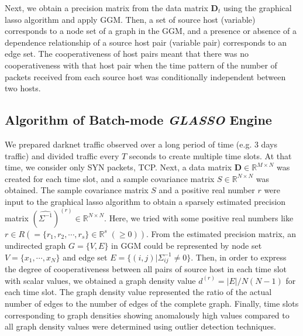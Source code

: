 \documentclass[conference]{IEEEtran}
\begin{document}
Next, we obtain a precision matrix from the data matrix $\bm{D}_t$ using the graphical lasso algorithm and apply GGM.
Then, a set of source host (variable) corresponds to a node set of a graph in the GGM, and a presence or absence of a dependence relationship of a source host pair (variable pair) corresponds to an edge set.
The cooperativeness of host pairs meant that there was no cooperativeness with that host pair when the time pattern of the number of packets received from each source host was conditionally independent between two hosts.




\subsection{Algorithm of Batch-mode {\it GLASSO} Engine}
We prepared darknet traffic observed over a long period of time (e.g. 3 days traffic) and divided traffic every $T$ seconds to create multiple time slots.
At that time, we consider only SYN packets, TCP.
Next, a data matrix $\bm{D}\in\mathbb{R}^{M \times N}$ was created for each time slot, and a sample covariance matrix $S\in\mathbb{R}^{N \times N}$ was obtained.
The sample covariance matrix $S$ and a positive real number $r$ were input to the graphical lasso algorithm to obtain a sparsely estimated precision matrix ${(\hat{\Sigma^{-1}})}^{(r)}\in\mathbb{R}^{N \times N}$.
Here, we tried with some positive real numbers like $r \in R ( = \{r_1, r_2, \cdots, r_s\}\in\mathbb{R}^s\;(\geq 0))$.
From the estimated precision matrix, an undirected graph $G = \{V, E\}$ in GGM could be represented by node set $V=\{x_{1}, \cdots, x_{N}\}$ and edge set $E=\{(i,j)|\Sigma^{-1}_{ij}\neq0\}$.
Then, in order to express the degree of cooperativeness between all pairs of source host in each time slot with scalar values, we obtained a graph density value $d^{(r)}=|E|/N(N-1)$ for each time slot.
The graph density value represented the ratio of the actual number of edges to the number of edges of the complete graph.
Finally, time slots corresponding to graph densities showing anomalously high values compared to all graph density values were determined using outlier detection techniques.
\end{document}

